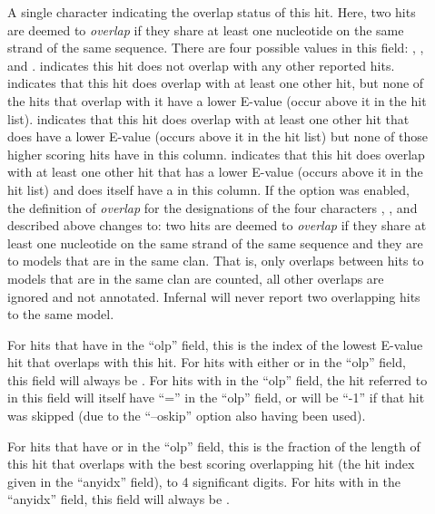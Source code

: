 \begin{description}

\item[] A single character indicating the overlap status
  of this hit. Here, two hits are deemed to \emph{overlap} if they
  share at least one nucleotide on the same strand of the same
  sequence. There are four possible values in this field: \ccode{*},
  \ccode{\^}, \ccode{$} and \ccode{=}.  \ccode{*} indicates this hit
  does not overlap with any other reported hits. \ccode{\^} indicates
  that this hit does overlap with at least one other hit, but none of
  the hits that overlap with it have a lower E-value (occur above it in
  the hit list). \ccode{$} indicates that this hit does overlap with
  at least one other hit that does have a lower E-value (occurs above
  it in the hit list) but none of those higher scoring hits have
  \ccode{\^} in this column. \ccode{=} indicates that this hit does
  overlap with at least one other hit that has a lower E-value (occurs
  above it in the hit list) and does itself have a \ccode{\^} in this
  column. If the  option was enabled, the definition of
  \emph{overlap} for the designations of the four characters
  \ccode{*}, \ccode{\^}, \ccode{$} and \ccode{=} described above
  changes to: two hits are deemed to \emph{overlap} if they share at
  least one nucleotide on the same strand of the same sequence and
  they are to models that are in the same clan. That is, only overlaps
  between hits to models that are in the same clan are counted, all
  other overlaps are ignored and not annotated.  Infernal will never
  report two overlapping hits to the same model.

\item[]
For hits that have \ccode{=} in the ``olp'' field, this is the
index of the lowest E-value hit that overlaps with this hit.
For hits with either \ccode{*} or \ccode{\^} in the ``olp'' field,
this field will always be \ccode{-}. For hits with \ccode{$} in the 
``olp'' field, the hit referred to in this field will itself have
``='' in the ``olp'' field, or will be ``-1'' if that hit was skipped
(due to the ``--oskip'' option also having been used).

\item[]
For hits that have \ccode{=} or \ccode{$} in the ``olp'' field, this is the
fraction of the length of this hit that overlaps with the best scoring
overlapping hit (the hit index given in the ``anyidx'' field), to
4 significant digits. 
For hits with \ccode{-} in the ``anyidx''
field, this field will always be \ccode{-}.  


\end{description}
